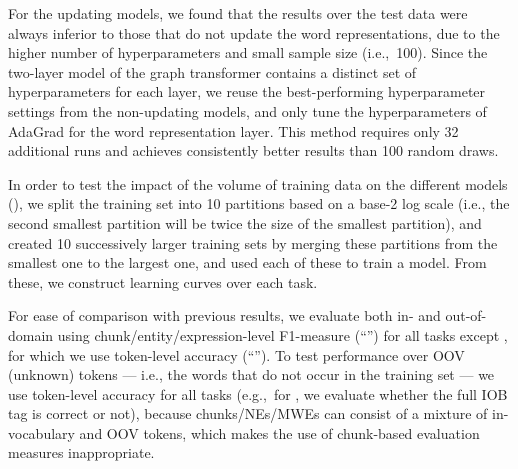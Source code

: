 For the updating models, we found that the results over the test data
were always inferior to those that do not update the word
representations, due to the higher number of hyperparameters and small
sample size (i.e.,\ 100).
Since the two-layer model of the graph transformer contains a distinct
set of hyperparameters for each layer, we reuse the best-performing
hyperparameter settings from the non-updating models, and only tune the
hyperparameters of AdaGrad for the word representation layer. 
This method requires only 32 additional runs and achieves consistently
better results than 100 random draws.

In order to test the impact of the volume of training data on the
different models (\RQ[2]), we split the training set into 10 partitions based on
a base-2 log scale (i.e., the second smallest partition will be twice
the size of the smallest partition), and created 10 successively larger
training sets by merging these partitions from the smallest one to the
largest one, and used each of these to train a model.
From these, we construct learning curves over each task.

For ease of comparison with previous results, we evaluate both
in- and out-of-domain using 
chunk/entity/expression-level F1-measure (``\fscore'') for all tasks except \pos,
for which we use token-level accuracy (``\accuracy'').
To test performance over OOV (unknown) tokens --- i.e., the words that do
not occur in the training set --- we use token-level accuracy for all
tasks (e.g.,\ for \chunking, we evaluate whether the full IOB tag is
correct or not), because chunks/NEs/MWEs can consist of a mixture of in-vocabulary and OOV tokens, which makes the use of chunk-based evaluation measures inappropriate.
 


